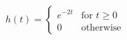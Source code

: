 \documentclass[preview]{standalone}
\begin{document}
\begin{align*}
{h}(t) = \begin{cases} e^{-2t} & \text{for } t \geq 0 \\ 0 & \text{otherwise} \end{cases}
\end{align*}
\end{document}
